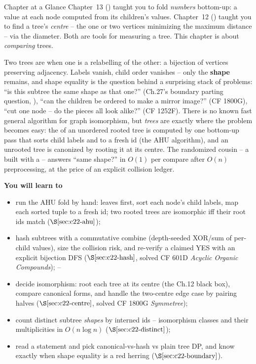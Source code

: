 \begin{chaptertheorybox}{Chapter at a Glance}
Chapter~13 () taught you to fold \emph{numbers} bottom-up: a value at
each node computed from its children's values.  Chapter~12 () taught
you to find a tree's \emph{centre} -- the one or two vertices minimizing the
maximum distance -- via the diameter.  Both are tools for measuring a tree.
This chapter is about \emph{comparing} trees.

Two trees are  when one is a relabelling of the other: a
bijection of vertices preserving adjacency.  Labels vanish, child order vanishes
-- only the \textbf{shape} remains, and shape equality is the question behind a
surprising stack of problems: ``is this subtree the same shape as that one?''
(Ch.27's boundary parting question, ), ``can the children be ordered
to make a mirror image?'' (CF 1800G), ``cut one node -- do the pieces all look
alike?'' (CF 1252F).  There is no known fast general algorithm for graph
isomorphism, but \emph{trees} are exactly where the problem becomes easy: the
 of an unordered rooted tree is computed by one bottom-up
pass that sorts child labels and  to a fresh id
(the AHU algorithm), and an unrooted tree is canonized by rooting it at its
centre.  The randomized cousin -- a  built with a
 -- answers ``same shape?'' in \(O(1)\) per compare
after \(O(n)\) preprocessing, at the price of an explicit collision ledger.

\textbf{You will learn to}
\begin{itemize}[nosep]
  \item run the AHU fold by hand: leaves first, sort each node's child labels,
        map each sorted tuple to a fresh id; two rooted trees are isomorphic iff
        their root ids match (\(\secref{c22-ahu}\)); \hfill{}
  \item hash subtrees with a commutative combine (depth-seeded XOR/sum of
        per-child values), size the collision risk, and re-verify a claimed YES
        with an explicit bijection DFS (\(\secref{c22-hash}\), solved CF 601D
        \emph{Acyclic Organic Compounds}); \hfill{}--
  \item decide  isomorphism: root each tree at its centre (the
        Ch.12 black box), compare canonical forms, and handle the two-centre
        edge case by pairing halves (\(\secref{c22-centre}\), solved CF 1800G
        \emph{Symmetree}); \hfill{}
  \item count distinct subtree \emph{shapes} by interned ids -- isomorphism
        classes and their multiplicities in \(O(n\log n)\)
        (\(\secref{c22-distinct}\)); \hfill{}
  \item read a statement and pick canonical-vs-hash vs plain tree DP, and know
        exactly when shape equality is a red herring
        (\(\secref{c22-boundary}\)). \hfill{}
\end{itemize}


\end{chaptertheorybox}
